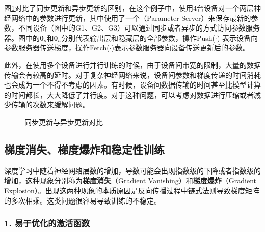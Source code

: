 \parinterval  图\ref{fig:9-47}对比了同步更新和异步更新的区别，在这个例子中，使用4台设备对一个两层神经网络中的参数进行更新，其中使用了一个{\small{}}（Parameter Server）来保存最新的参数，不同设备（图中的G1、G2、G3）可以通过同步或者异步的方式访问参数服务器。图中的$ {\bm \theta}_o $和$ {\bm \theta}_h $分别代表输出层和隐藏层的全部参数，操作Push($\cdot$) 表示设备向参数服务器传送梯度，操作Fetch($\cdot$)表示参数服务器向设备传送更新后的参数。

\parinterval  此外，在使用多个设备进行并行训练的时候，由于设备间带宽的限制，大量的数据传输会有较高的延时。对于复杂神经网络来说，设备间参数和梯度传递的时间消耗也会成为一个不得不考虑的因素。有时候，设备间数据传输的时间甚至比模型计算的时间都长，大大降低了并行度。对于这种问题，可以考虑对数据进行压缩或者减少传输的次数来缓解问题。

\begin{figure}[htp]
\centering

\caption{同步更新与异步更新对比}
\label{fig:9-47}
\end {figure}



\subsection{梯度消失、梯度爆炸和稳定性训练}\label{sec:9.4.4}

\parinterval  深度学习中随着神经网络层数的增加，导数可能会出现指数级的下降或者指数级的增加，这种现象分别称为{\small\sffamily\bfseries{梯度消失}}（Gradient Vanishing）和{\small\sffamily\bfseries{梯度爆炸}}（Gradient Explosion）。出现这两种现象的本质原因是反向传播过程中链式法则导致梯度矩阵的多次相乘。这类问题很容易导致训练的不稳定。


\subsubsection{1. 易于优化的激活函数}

